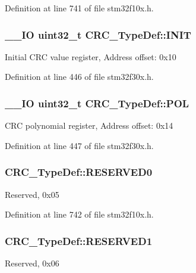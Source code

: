 Definition at line 741 of file stm32f10x.\-h.

\hypertarget{struct_c_r_c___type_def_a13639f272f5093e184d726ed5a8945a3}{
\subsubsection[{I\-N\-I\-T}]{\setlength{\rightskip}{0pt plus 5cm}\-\_\-\-\_\-\-I\-O {\bf uint32\-\_\-t} C\-R\-C\-\_\-\-Type\-Def\-::\-I\-N\-I\-T}}\label{struct_c_r_c___type_def_a13639f272f5093e184d726ed5a8945a3}
Initial C\-R\-C value register, Address offset\-: 0x10 

Definition at line 446 of file stm32f30x.\-h.

\hypertarget{struct_c_r_c___type_def_a0a6a8675609cee77ff162e575cfc74e8}{
\subsubsection[{P\-O\-L}]{\setlength{\rightskip}{0pt plus 5cm}\-\_\-\-\_\-\-I\-O {\bf uint32\-\_\-t} C\-R\-C\-\_\-\-Type\-Def\-::\-P\-O\-L}}\label{struct_c_r_c___type_def_a0a6a8675609cee77ff162e575cfc74e8}
C\-R\-C polynomial register, Address offset\-: 0x14 

Definition at line 447 of file stm32f30x.\-h.

\hypertarget{struct_c_r_c___type_def_a70dfd1730dba65041550ef55a44db87c}{
\subsubsection[{R\-E\-S\-E\-R\-V\-E\-D0}]{ C\-R\-C\-\_\-\-Type\-Def\-::\-R\-E\-S\-E\-R\-V\-E\-D0}}\label{struct_c_r_c___type_def_a70dfd1730dba65041550ef55a44db87c}
Reserved, 0x05 

Definition at line 742 of file stm32f10x.\-h.

\hypertarget{struct_c_r_c___type_def_a8b205c6e25b1808ac016db2356b3021d}{
\subsubsection[{R\-E\-S\-E\-R\-V\-E\-D1}]{ C\-R\-C\-\_\-\-Type\-Def\-::\-R\-E\-S\-E\-R\-V\-E\-D1}}\label{struct_c_r_c___type_def_a8b205c6e25b1808ac016db2356b3021d}
Reserved, 0x06 

